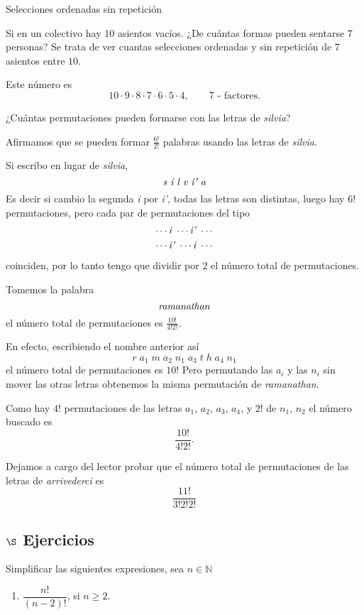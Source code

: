 \begin{section}{Selecciones ordenadas sin repetición}
\begin{ejemplo*}
Si en un colectivo hay $10$ asientos vacíos. ¿De cuántas formas
pueden sentarse $7$ personas? Se trata de ver cuantas selecciones ordenadas y sin repetición de $7$ asientos entre $10$. 

Este número es
$$
10 \cdot 9 \cdot 8 \cdot 7 \cdot 6 \cdot 5 \cdot 4, \qquad \text{$7$ - factores.}
$$
\end{ejemplo*}


\begin{ejemplo*}
¿Cuántas permutaciones pueden formarse con las letras de
{\em silvia}?

Afirmamos que se pueden formar  $\displaystyle{\frac{6!}{2!}}$ palabras usando las letras de {\em silvia}.

Si escribo en lugar de {\em silvia},
$$
\text{\em s i l v i' a}
$$
Es decir si cambio la segunda {\em i } por {\em i'}, todas las letras son distintas, luego hay $6!$ permutaciones, pero
cada par de permutaciones del tipo
\begin{align*}
\cdots \text{\em i } \cdots  \text{\em i' }  \cdots \\
\cdots \text{\em i' } \cdots  \text{\em i } \cdots
\end{align*}
coinciden, por lo tanto tengo que dividir por $2$ el número total de permutaciones.

Tomemos la palabra
$$
\text{\em ramanathan}
$$
el número total de permutaciones es $\displaystyle{\frac{10!}{ 4!2!}}$.

En efecto, escribiendo el nombre anterior así 
$$
r\;a_1\;m\;a_2\;n_1\;a_3\;t\;h\;a_4\;n_1
$$
el número total de permutaciones es $10!$ Pero
permutando las $a_i$ y las $n_i$ sin mover las otras letras obtenemos
la misma permutación de {\em ramanathan}.

Como hay $4!$ permutaciones de las letras $a_1$, $a_2$, $a_3$, $a_4$, y
$2!$ de $n_1$, $n_2$ el número buscado es 
$$
\frac{10!}{ 4!2!}.
$$

Dejamos a cargo del lector probar que el número total de
permutaciones de las letras de {\em a\-rri\-ve\-der\-ci} es
$$
\frac{11!}{3!  2!  2!}  
$$
\end{ejemplo*}


\subsection*{$\S$ Ejercicios}
    Simplificar las siguientes expresiones, sea $n \in \mathbb N$
    \begin{multicols}{2}
\begin{enumerate}
    \item $\dfrac{n!}{( n - 2 ) !}$, \qquad si $n \geq 2$.
    

\end{enumerate}
\end{multicols}
\end{section}
